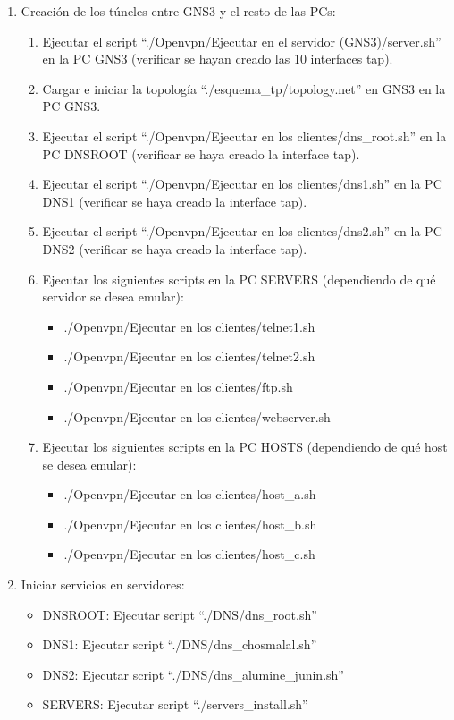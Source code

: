 \documentclass[12pt, a4paper, spanish]{article}
\begin{document}
\begin{enumerate}
	\item Creación de los túneles entre GNS3 y el resto de las PCs:
	\begin{enumerate}
	\item Ejecutar el script 
		``./Openvpn/Ejecutar en el servidor (GNS3)/server.sh'' en la PC GNS3 
		(verificar se hayan creado las 10 interfaces tap).
	\item Cargar e iniciar la topología ``./esquema\_tp/topology.net'' en GNS3 
		en la PC GNS3.
	\item Ejecutar el script ``./Openvpn/Ejecutar en los clientes/dns\_root.sh'' 
		en la PC DNSROOT (verificar se haya creado la interface tap).
	\item Ejecutar el script ``./Openvpn/Ejecutar en los clientes/dns1.sh'' en 
		la PC DNS1 (verificar se haya creado la interface tap).
	\item Ejecutar el script ``./Openvpn/Ejecutar en los clientes/dns2.sh'' en 
		la PC DNS2 (verificar se haya creado la interface tap).
	\item Ejecutar los siguientes scripts en la PC SERVERS (dependiendo de qué 
		servidor se desea emular):
		\begin{itemize}
		\item ./Openvpn/Ejecutar en los clientes/telnet1.sh
		\item ./Openvpn/Ejecutar en los clientes/telnet2.sh
		\item ./Openvpn/Ejecutar en los clientes/ftp.sh
		\item ./Openvpn/Ejecutar en los clientes/webserver.sh
		\end{itemize}
	\item Ejecutar los siguientes scripts en la PC HOSTS (dependiendo de qué 
		host se desea emular):
		\begin{itemize}
		\item ./Openvpn/Ejecutar en los clientes/host\_a.sh
		\item ./Openvpn/Ejecutar en los clientes/host\_b.sh
		\item ./Openvpn/Ejecutar en los clientes/host\_c.sh
		\end{itemize}
	\end{enumerate}
\item Iniciar servicios en servidores:
	\begin{itemize}
	\item DNSROOT: Ejecutar script ``./DNS/dns\_root.sh''
	\item DNS1: Ejecutar script ``./DNS/dns\_chosmalal.sh''
	\item DNS2: Ejecutar script ``./DNS/dns\_alumine\_junin.sh''
	\item SERVERS: Ejecutar script ``./servers\_install.sh''
	\end{itemize}
\end{enumerate}
\end{document}
